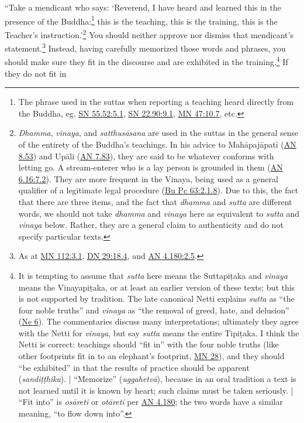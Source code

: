 \documentclass[12pt,openany]{book}%
\begin{document}
“Take a mendicant who says: ‘Reverend, I have heard and learned this in the presence of the Buddha:\footnote{The phrase used in the suttas when reporting a teaching heard directly from the Buddha, eg. \href{https://suttacentral.net/sn55.52/en/sujato\#5.1}{SN 55.52:5.1}, \href{https://suttacentral.net/sn22.90/en/sujato\#9.1}{SN 22.90:9.1}, \href{https://suttacentral.net/mn47/en/sujato\#10.7}{MN 47:10.7}, etc. } this is the teaching, this is the training, this is the Teacher’s instruction.’\footnote{\textit{Dhamma}, \textit{vinaya}, and \textit{\textsanskrit{satthusāsana}} are used in the suttas in the general sense of the entirety of the Buddha’s teachings. In his advice to \textsanskrit{Mahāpajāpatī} (\href{https://suttacentral.net/an8.53/en/sujato}{AN 8.53}) and \textsanskrit{Upāli} (\href{https://suttacentral.net/an7.83/en/sujato}{AN 7.83}), they are said to be whatever conforms with letting go. A stream-enterer who is a lay person is grounded in them (\href{https://suttacentral.net/an6.16/en/sujato\#7.2}{AN 6.16:7.2}). They are more frequent in the Vinaya, being used as a general qualifier of a legitimate legal procedure (\href{https://suttacentral.net/pli-tv-bu-vb-pc63/en/sujato\#2.1.8}{Bu Pc 63:2.1.8}). Due to this, the fact that there are three items, and the fact that \textit{dhamma} and \textit{sutta} are different words, we should not take \textit{dhamma} and \textit{vinaya} here as equivalent to \textit{sutta} and \textit{vinaya} below. Rather, they are a general claim to authenticity and do not specify particular texts. } You should neither approve nor dismiss that mendicant’s statement.\footnote{As at \href{https://suttacentral.net/mn112/en/sujato\#3.1}{MN 112:3.1}, \href{https://suttacentral.net/dn29/en/sujato\#18.4}{DN 29:18.4}, and \href{https://suttacentral.net/an4.180/en/sujato\#2.5}{AN 4.180:2.5}. } Instead, having carefully memorized those words and phrases, you should make sure they fit in the discourse and are exhibited in the training.\footnote{It is tempting to assume that \textit{sutta} here means the \textsanskrit{Suttapiṭaka} and \textit{vinaya} means the \textsanskrit{Vinayapiṭaka}, or at least an earlier version of these texts; but this is not supported by tradition. The late canonical Netti explains \textit{sutta} as “the four noble truths” and \textit{vinaya} as “the removal of greed, hate, and delusion” (\href{https://suttacentral.net/ne6/en/sujato}{Ne 6}). The commentaries discuss many interpretations; ultimately they agree with the Netti for \textit{vinaya}, but say \textit{sutta} means the entire \textsanskrit{Tipiṭaka}. I think the Netti is correct: teachings should “fit in” with the four noble truths (like other footprints fit in to an elephant’s footprint, \href{https://suttacentral.net/mn28/en/sujato}{MN 28}), and they should “be exhibited” in that the results of practice should be apparent (\textit{\textsanskrit{sandiṭṭhika}}). | “Memorize” (\textit{\textsanskrit{uggahetvā}}), because in an oral tradition a text is not learned until it is known by heart; such claims must be taken seriously. | “Fit into” is \textit{\textsanskrit{osāreti}} or \textit{\textsanskrit{otāreti}} per \href{https://suttacentral.net/an4.180/en/sujato}{AN 4.180}; the two words have a similar meaning, “to flow down into”. } If they do not fit in 
\end{document}
